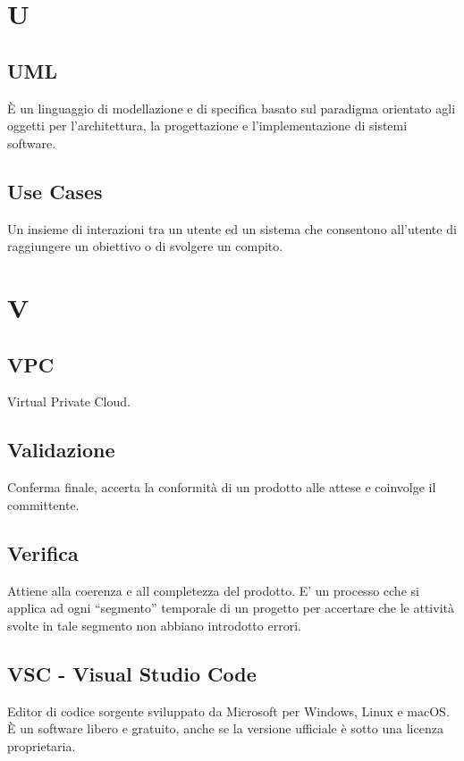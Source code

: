 \documentclass{classes/base}
\begin{document}
        \newpage  
    \section{U}
        \subsection*{UML}
		È un linguaggio di modellazione e di specifica basato sul paradigma orientato agli oggetti per l'architettura, la progettazione e l'implementazione di sistemi software.

        \subsection*{Use Cases} 
        Un insieme di interazioni tra un utente ed un sistema che consentono all'utente di raggiungere un obiettivo o di svolgere un compito.
        
        \newpage  
    \section{V}

        \subsection*{VPC}
        Virtual Private Cloud.

        \subsection*{Validazione} 
        Conferma finale, accerta la conformità di un prodotto alle attese e coinvolge il committente.

        \subsection*{Verifica}
        Attiene alla coerenza e all completezza del prodotto. E’ un processo cche si applica ad ogni “segmento” temporale di un progetto per accertare che le attività svolte in tale segmento non abbiano introdotto errori.

        \subsection*{VSC - Visual Studio Code}
        Editor di codice sorgente sviluppato da Microsoft per Windows, Linux e macOS. È un software libero e gratuito, anche se la versione ufficiale è sotto una licenza proprietaria.
\end{document}
